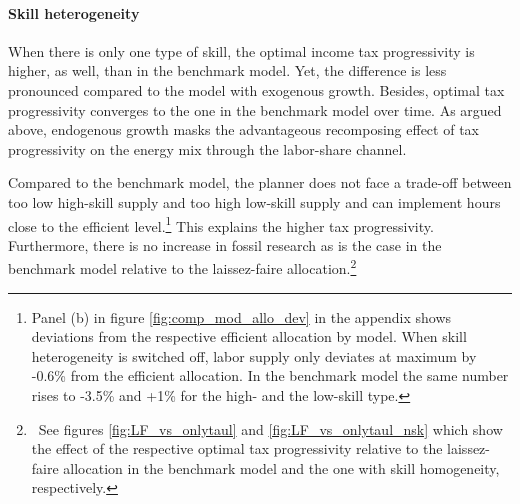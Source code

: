\paragraph{Skill heterogeneity}
When there is only one type of skill, the optimal income tax progressivity is higher, as well, than in the benchmark model. Yet, the difference is less pronounced compared to the model with exogenous growth. Besides, optimal tax progressivity converges to the one in the benchmark model over time. 
As argued above, endogenous growth masks the advantageous recomposing effect of tax progressivity on the energy mix through the labor-share channel. 

Compared to the benchmark model, the planner does not face a trade-off between too low high-skill supply and too high low-skill supply and can implement hours close to the efficient level.\footnote{ Panel (b) in figure \ref{fig:comp_mod_allo_dev} in the appendix shows deviations from the respective efficient allocation by model. When skill heterogeneity is switched off, labor supply only deviates at maximum by -0.6\% from the efficient allocation. In the benchmark model the same number rises to -3.5\% and +1\% for the high- and the low-skill type. } This explains the higher tax progressivity. 
Furthermore, there is no increase in fossil research as is the case in the benchmark model relative to the laissez-faire allocation.\footnote{\ See figures \ref{fig:LF_vs_onlytaul} and \ref{fig:LF_vs_onlytaul_nsk} which show the effect of the respective optimal  tax progressivity relative to the laissez-faire allocation in the benchmark model and the one with skill homogeneity, respectively.}

